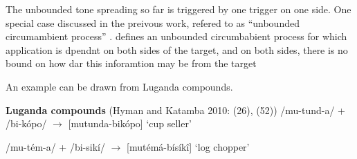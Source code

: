


The unbounded tone spreading so far is triggered by one trigger on one
side. One special case discussed in the preivous work, refered to as
``unbounded circumambient process'' \citep{jardine2016locality,oddenbook,hyman2011tone}.
\citet{jardine2016locality} defines an unbounded circumbabient process
for which application is dpendnt on both sides of the target, and
on both sides, there is no bound on how dar this inforamtion 
may be from the target 

An example can be drawn from Luganda compounds.

\pex \textbf{Luganda compounds} (Hyman and Katamba 2010: (26), (52))
\a /mu-tund-a/ + /bi-kópo/ $\rightarrow$ [mutunda-bikópo]
    \hfill `cup seller'
    
\a /mu-tém-a/ + /bi-sikí/ $\rightarrow$ [mutémá-bísíkî]
    \hfill `log chopper'
\xe



